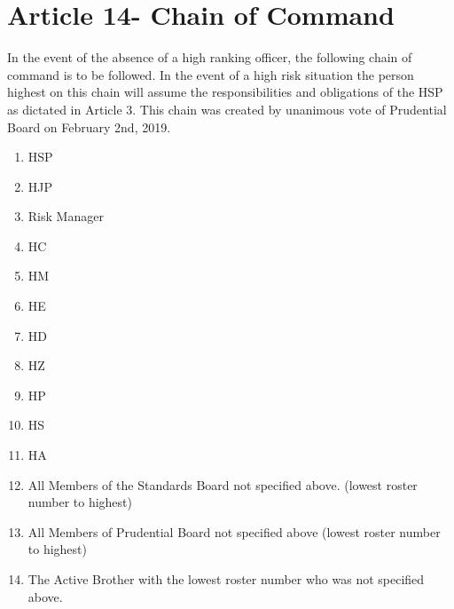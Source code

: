 \documentclass{article}
\begin{document}
\section*{Article 14- Chain of Command}
\hspace*{1cm}In the event of the absence of a high ranking officer, the following chain of command is to be followed. In the event of a high risk situation the person highest on this chain will assume the responsibilities and obligations of the HSP as dictated in Article 3. This chain was created by unanimous vote of Prudential Board on February 2nd, 2019.
\begin{enumerate}
    \item HSP
    \item HJP
    \item Risk Manager
    \item HC
    \item HM
    \item HE
    \item HD
    \item HZ
    \item HP
    \item HS
    \item HA
    \item All Members of the Standards Board not specified above. (lowest roster number to highest)
    \item All Members of Prudential Board not specified above
    (lowest roster number to highest)
    \item The Active Brother with the lowest roster number who was not specified above. 
\end{enumerate}
\end{document}
